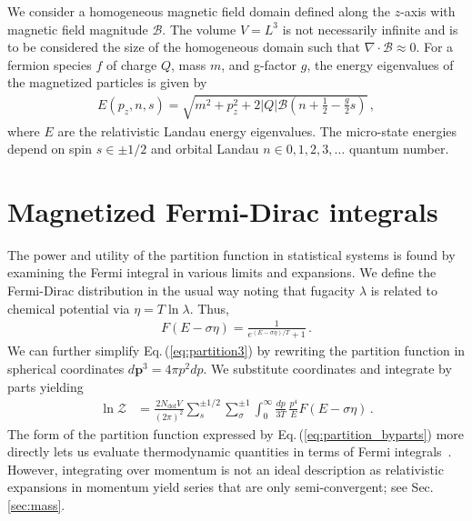\documentclass[epjST]{svjour}
\newcommand{\req}[1]{Eq.\,(\ref{#1})}
\newcommand{\rsec}[1]{Sec.\,{\ref{#1}}}
\numberwithin{equation}{section}
\begin{document}
We consider a homogeneous magnetic field domain defined along the $z$-axis with magnetic field magnitude $\mathcal{B}$. The volume $V=L^{3}$ is not necessarily infinite and is to be considered the size of the homogeneous domain such that $\nabla\cdot\mathcal{B}\approx0$. For a fermion species $f$ of charge $Q$, mass $m$, and g-factor $g$, the energy eigenvalues of the magnetized particles is given by~\cite{Steinmetz:2018ryf}
\begin{align}
    \label{eq:energystates}
    E(p_{z},n,s)=\sqrt{m^{2}+p_{z}^{2}+2|Q|\mathcal{B}\left(n+\frac{1}{2}-\frac{g}{2}s\right)}\,,
\end{align}
where $E$ are the relativistic Landau energy eigenvalues. The micro-state energies depend on spin $s\in\pm1/2$ and orbital Landau $n\in0,1,2,3,\ldots$ quantum number.

\section{Magnetized Fermi-Dirac integrals}
\label{sec:fermi_integrals}
The power and utility of the partition function in statistical systems is found by examining the Fermi integral in various limits and expansions. We define the Fermi-Dirac distribution in the usual way noting that fugacity \(\lambda\) is related to chemical potential via \(\eta = T\ln\lambda\). Thus,
\begin{align}
    F\left(E - \sigma\eta\right) = \frac{1}{e^{(E - \sigma\eta)/T} + 1}\,.
\end{align}
We can further simplify \req{eq:partition3} by rewriting the partition function in spherical coordinates \(d\mathbf{p}^{3}=4\pi p^{2}dp\). We substitute coordinates and integrate by parts yielding
\begin{align}
    \label{eq:partition_byparts}
    \ln\mathcal{Z} &= \frac{2 N_\mathrm{dof}V}{(2\pi)^{2}} \sum_{s}^{\pm1/2}\sum_{\sigma}^{\pm1}\int_{0}^{\infty} \frac{dp}{3T} \, \frac{p^4}{E}F\left(E - \sigma\eta\right)\,.
\end{align}
The form of the partition function expressed by \req{eq:partition_byparts} more directly lets us evaluate thermodynamic quantities in terms of Fermi integrals~\cite{Elze:1980er}. However, integrating over momentum is not an ideal description as relativistic expansions in momentum yield series that are only semi-convergent; see \rsec{sec:mass}.

\end{document}
